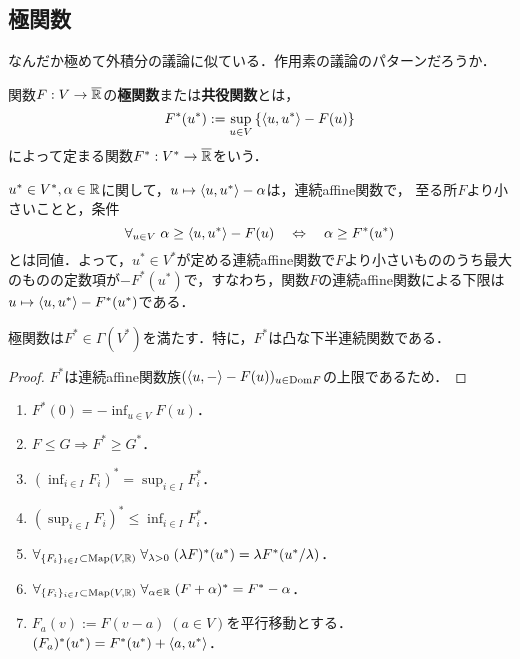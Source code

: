 \documentclass[uplatex,dvipdfmx]{jsreport}
\begin{document}
\subsection{極関数}

\begin{tcolorbox}[colframe=ForestGreen, colback=ForestGreen!10!white,breakable,colbacktitle=ForestGreen!40!white,coltitle=black,fonttitle=\bfseries\sffamily,
title=]
    なんだか極めて外積分の議論に似ている．作用素の議論のパターンだろうか．
\end{tcolorbox}

\begin{definition}
    関数$F:V\to\overline{\mathbb{R}}$の\textbf{極関数}または\textbf{共役関数}とは，
    \[F^*(u^*):=\sup_{u\in V}\left\{\langle u,u^*\rangle-F(u)\right\}\]
    によって定まる関数$F^*:V^*\to\overline{\mathbb{R}}$をいう．
\end{definition}
\begin{remarks}
    $u^*\in V^*,\alpha\in\mathbb{R}$に関して，$u\mapsto\langle u,u^*\rangle-\alpha$は，連続affine関数で，
    至る所$F$より小さいことと，条件
    \[\forall_{u\in V}\;\alpha\ge\langle u,u^*\rangle-F(u)\quad\Leftrightarrow\quad\alpha\ge F^*(u^*)\]
    とは同値．よって，$u^*\in V^*$が定める連続affine関数で$F$より小さいもののうち最大のものの定数項が$-F^*(u^*)$で，すなわち，関数$F$の連続affine関数による下限は$u\mapsto\langle u,u^*\rangle-F^*(u^*)$である．
\end{remarks}

\begin{lemma}
    極関数は$F^*\in\Gamma(V^*)$を満たす．特に，$F^*$は凸な下半連続関数である．
\end{lemma}
\begin{proof}
    $F^*$は連続affine関数族$(\langle u,-\rangle-F(u))_{u\in\mathrm{Dom} F}$の上限であるため．
\end{proof}

\begin{corollary}\mbox{}
    \begin{enumerate}
        \item $F^*(0)=-\inf_{u\in V}F(u)$．
        \item $F\le G\Rightarrow F^*\ge G^*$．
        \item $(\inf_{i\in I}F_i)^*=\sup_{i\in I}F^*_i$．
        \item $(\sup_{i\in I}F_i)^*\le\inf_{i\in I}F^*_i$．
        \item $\forall_{\{F_i\}_{i\in I}\subset\mathrm{Map}(V,\mathbb{R})}\;\forall_{\lambda>0}\;(\lambda F)^*(u^*)=\lambda F^*(u^*/\lambda)$．
        \item $\forall_{\{F_i\}_{i\in I}\subset\mathrm{Map}(V,\mathbb{R})}\;\forall_{\alpha\in\mathbb{R}}\;(F+\alpha)^*=F^*-\alpha$．
        \item $F_a(v):=F(v-a)\;(a\in V)$を平行移動とする．$(F_a)^*(u^*)=F^*(u^*)+\langle a,u^*\rangle$．
    \end{enumerate}
\end{corollary}
\end{document}
